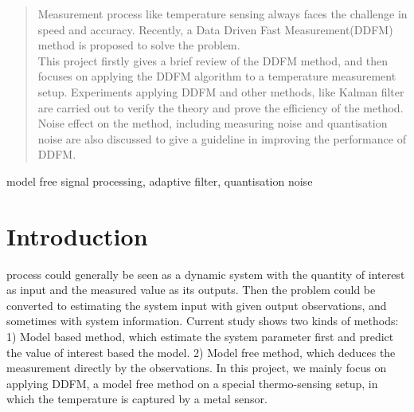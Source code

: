 \documentclass[journal]{IEEEtran}
\begin{document}
\begin{abstract}
Measurement process like temperature sensing always faces the challenge in speed and accuracy. Recently, a Data Driven Fast Measurement(DDFM) method is proposed to solve the problem. \\
This project firstly gives a brief review of the DDFM method, and then focuses on applying the DDFM algorithm to a temperature measurement setup. Experiments applying DDFM and other methods, like Kalman filter are carried out to verify the theory and prove the efficiency of the method. Noise effect on the method, including measuring noise and quantisation noise are also discussed to give a guideline in improving the performance of DDFM. 

\end{abstract}

\begin{IEEEkeywords}
model free signal processing, adaptive filter, quantisation noise
\end{IEEEkeywords}


\section{Introduction}
% 
% 
% 
% 


 process could generally be seen as a dynamic system with the quantity of interest as input and the measured value as its outputs. Then the problem could be converted to estimating the system input with given output observations, and sometimes with system information. Current study shows two kinds of methods: 1) Model based method, which estimate the system parameter first and predict the value of interest based the model. 2) Model free method, which deduces the measurement directly by the observations. In this project, we mainly focus on applying DDFM, a model free method on a special thermo-sensing setup, in which the temperature is captured by a metal sensor.
\end{document}
